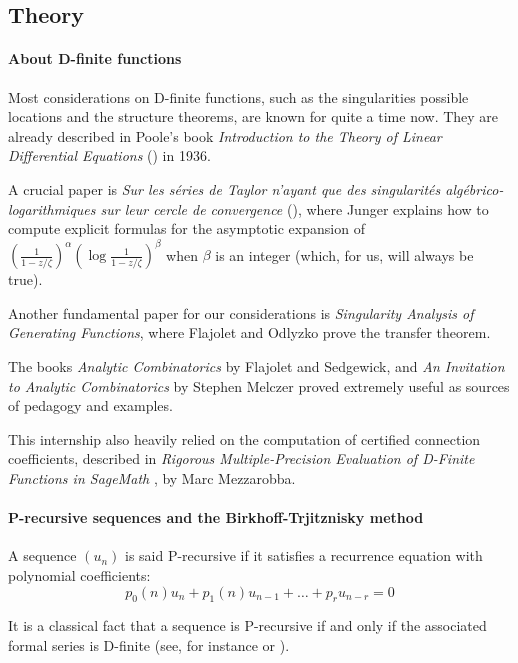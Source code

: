 \documentclass[../main.tex]{subfiles}
\begin{document}
\subsection*{Theory}

\paragraph{About D-finite functions}
Most considerations on D-finite functions, such as the singularities possible locations and the structure theorems, are known for quite a time now. They are already described in Poole's book \emph{Introduction to the Theory of Linear Differential Equations} (\cite{Poole1936}) in 1936.

A crucial paper is \emph{Sur les séries de Taylor n’ayant que des singularités algébrico-logarithmiques sur leur cercle de convergence} (\cite{Jungen1931}), where Junger explains how to compute explicit formulas for the asymptotic expansion of ${\left(\frac{1}{1 - z/\zeta}\right)}^\alpha {\left( \log \frac{1}{1 - z/\zeta} \right)}^\beta$ when $\beta$ is an integer (which, for us, will always be true).

Another fundamental paper for our considerations is \emph{Singularity Analysis of Generating Functions}, where Flajolet and Odlyzko \cite{FlajoletOdlyzko1990} prove the transfer theorem.

The books \emph{Analytic Combinatorics} \cite{Flajolet2009} by Flajolet and Sedgewick, and \emph{An Invitation to Analytic Combinatorics} \cite{Melczer2020} by Stephen Melczer proved extremely useful as sources of pedagogy and examples.

This internship also heavily relied on the computation of certified connection coefficients, described in \emph{Rigorous Multiple-Precision Evaluation of D-Finite Functions in SageMath} \cite{mezzarobba2106}, by Marc Mezzarobba.

\paragraph{P-recursive sequences and the Birkhoff-Trjitznisky method}

A sequence $(u_n)$ is said P-recursive if it satisfies a recurrence equation with polynomial coefficients:
$$
p_0(n) u_n + p_1(n) u_{n-1} + \dots + p_r u_{n-r} = 0
$$

It is a classical fact that a sequence is P-recursive if and only if the associated formal series is D-finite (see, for instance \cite{Flajolet2009} or \cite{Melczer2020}).
\end{document}
